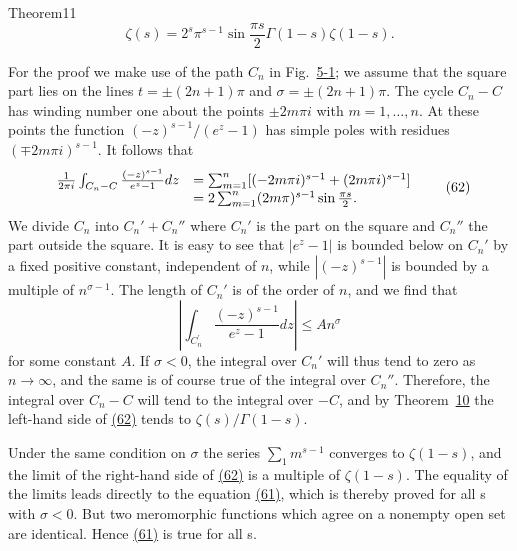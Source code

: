 \begin{originalstatement}{Theorem}{11}\label{thm:5.11}
\begin{equation*}
\zeta (s) = 2 ^ {s} \pi^ {s - 1} \sin \frac {\pi s}{2} \Gamma (1 - s) \zeta (1 - s).\tag{61}\label{eq:5.61}
\end{equation*}
\end{originalstatement}
For the proof we make use of the path $C_{n}$ in Fig.~\hyperref[fig:5-1]{5-1}; we assume that the square part lies on the lines $t = \pm(2n + 1)\pi$ and $\sigma = \pm(2n + 1)\pi$. The cycle $C_{n} - C$ has winding number one about the points $\pm2m\pi i$ with $m = 1, \ldots, n$. At these points the function $(-z)^{s-1}/(e^{z} - 1)$ has simple poles with residues $(\mp2m\pi i)^{s-1}$. It follows that
\begin{equation*}
\begin{array}{r l} \frac {1}{2 \pi i} \int_ {C _ {n} - C} \frac {(- z) ^ {s - 1}}{e ^ {z} - 1} d z & = \sum_ {m = 1} ^ {n} [ (- 2 m \pi i) ^ {s - 1} + (2 m \pi i) ^ {s - 1} ] \\ & = 2 \sum_ {m = 1} ^ {n} (2 m \pi) ^ {s - 1} \sin \frac {\pi s}{2}. \end{array}\tag{62}\label{eq:5.62}
\end{equation*}
We divide $C_n$ into $C_n' + C_n''$ where $C_n'$ is the part on the square and $C_n''$ the part outside the square. It is easy to see that $|e^z - 1|$ is bounded below on $C_n'$ by a fixed positive constant, independent of $n$, while $|(-z)^{s-1}|$ is bounded by a multiple of $n^{\sigma-1}$. The length of $C_n'$ is of the order of $n$, and we find that
\begin{equation*}
\left| \int_ {C _ {n} ^ {\prime}} \frac {(- z) ^ {s - 1}}{e ^ {z} - 1} d z \right| \leq A n ^ {\sigma}
\end{equation*}
for some constant $A$. If $\sigma < 0$, the integral over $C_n'$ will thus tend to zero as $n \to \infty$, and the same is of course true of the integral over $C_n''$. Therefore, the integral over $C_n - C$ will tend to the integral over $-C$, and by Theorem~\hyperref[thm:5.10]{10} the left-hand side of \hyperref[eq:5.62]{(62)} tends to $\zeta(s)/\Gamma(1 - s)$.

Under the same condition on $\sigma$ the series $\sum_{1} m^{s-1}$ converges to
$\zeta(1 - s)$, and the limit of the right-hand side of \hyperref[eq:5.62]{(62)} is a multiple of $\zeta(1 - s)$. The equality of the limits leads directly to the equation \hyperref[eq:5.61]{(61)}, which is thereby proved for all s with $\sigma < 0$. But two meromorphic functions which agree on a nonempty open set are identical. Hence \hyperref[eq:5.61]{(61)} is true for all s.

